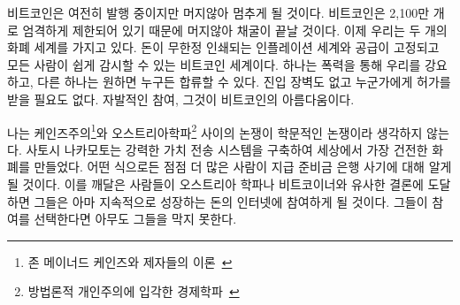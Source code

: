 \begin{comment}
While Bitcoin is still inflationary, it will cease to be so rather soon.
The strictly limited supply of 21 million bitcoins will eventually do
away with inflation completely. We now have two monetary worlds: an
inflationary one where money is printed arbitrarily, and the world of
Bitcoin, where final supply is fixed and easily auditable for everyone.
One is forced upon us by violence, the other can be joined by anyone who
wishes to do so. No barriers to entry, no one to ask for permission.
Voluntary participation. That is the beauty of Bitcoin.
\end{comment}
비트코인은 여전히 발행 중이지만 머지않아 멈추게 될 것이다. 
비트코인은 2,100만 개로 엄격하게 제한되어 있기 때문에 머지않아 채굴이 끝날 것이다.
이제 우리는 두 개의 화폐 세계를 가지고 있다. 
돈이 무한정 인쇄되는 인플레이션 세계와 공급이 고정되고 모든 사람이 쉽게 감시할 수 있는 비트코인 세계이다. 
하나는 폭력을 통해 우리를 강요하고,
다른 하나는 원하면 누구든 합류할 수 있다.
진입 장벽도 없고 누군가에게 허가를 받을 필요도 없다. 
자발적인 참여, 그것이 비트코인의 아름다움이다.

\begin{comment}
I would argue that the argument between Keynesian\footnote{Theories according to
John Maynard Keynes and his deciples~\cite{wiki:keynesian}} and
Austrian\footnote{School of economic thought based on methodological
individualism~\cite{wiki:austrian}} economists is no longer purely academical.
Satoshi managed to build a system for value transfer on steroids, creating the
soundest money which ever existed in the process. One way or another, more and
more people will learn about the scam which is fractional reserve banking. If
they come to similar conclusions as most Austrians and Bitcoiners, they might
join the ever-growing internet of money. Nobody can stop them if they choose to
do so.
\end{comment}
나는 케인즈주의\footnote{존 메이너드 케인즈와 제자들의 이론~\cite{wiki:keynesian}}와 오스트리아학파\footnote{방법론적 개인주의에 입각한 경제학파~\cite{wiki:austrian}} 사이의 논쟁이 학문적인 논쟁이라 생각하지 않는다. 
사토시 나카모토는 강력한 가치 전송 시스템을 구축하여 세상에서 가장 건전한 화폐를 만들었다. 
어떤 식으로든 점점 더 많은 사람이 지급 준비금 은행 사기에 대해 알게 될 것이다. 
이를 깨달은 사람들이 오스트리아 학파나 비트코이너와 유사한 결론에 도달하면 
그들은 아마 지속적으로 성장하는 돈의 인터넷에 참여하게 될 것이다. 
그들이 참여를 선택한다면 아무도 그들을 막지 못한다.

